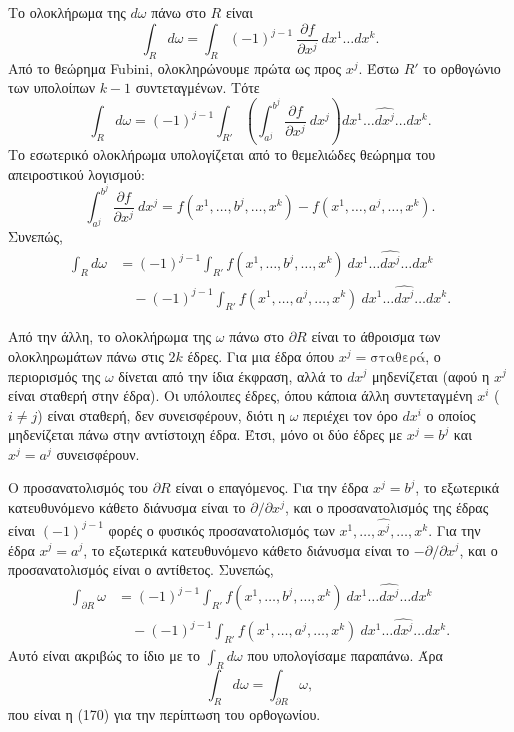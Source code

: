 \documentclass[12pt]{article}
\begin{document}
Το ολοκλήρωμα της $d\omega$ πάνω στο $R$ είναι
\[
\int_R d\omega = \int_R (-1)^{j-1} \ \frac{\partial f}{\partial x^j} \ dx^1 \dots dx^k.
\]
Από το θεώρημα Fubini, ολοκληρώνουμε πρώτα ως προς $x^j$. Έστω $R'$ το ορθογώνιο των υπολοίπων $k-1$ συντεταγμένων. Τότε
\[
\int_R d\omega = (-1)^{j-1} \int_{R'} \left( \int_{a^j}^{b^j} \frac{\partial f}{\partial x^j} \ dx^j \right) dx^1 \dots \widehat{dx^j} \dots dx^k.
\]
Το εσωτερικό ολοκλήρωμα υπολογίζεται από το θεμελιώδες θεώρημα του απειροστικού λογισμού:
\[
\int_{a^j}^{b^j} \frac{\partial f}{\partial x^j} \ dx^j = f(x^1, \dots, b^j, \dots, x^k) - f(x^1, \dots, a^j, \dots, x^k).
\]
Συνεπώς,
\[
\begin{aligned}
\int_R d\omega &= (-1)^{j-1} \int_{R'} f(x^1, \dots, b^j, \dots, x^k) \ dx^1 \dots \widehat{dx^j} \dots dx^k \\
&\quad - (-1)^{j-1} \int_{R'} f(x^1, \dots, a^j, \dots, x^k) \ dx^1 \dots \widehat{dx^j} \dots dx^k.
\end{aligned}
\]

Από την άλλη, το ολοκλήρωμα της $\omega$ πάνω στο $\partial R$ είναι το άθροισμα των ολοκληρωμάτων πάνω στις $2k$ έδρες. Για μια έδρα όπου $x^j = \text{σταθερά}$, ο περιορισμός της $\omega$ δίνεται από την ίδια έκφραση, αλλά το $dx^j$ μηδενίζεται (αφού η $x^j$ είναι σταθερή στην έδρα). Οι υπόλοιπες έδρες, όπου κάποια άλλη συντεταγμένη $x^i$ ($i \neq j$) είναι σταθερή, δεν συνεισφέρουν, διότι η $\omega$ περιέχει τον όρο $dx^i$ ο οποίος μηδενίζεται πάνω στην αντίστοιχη έδρα. Έτσι, μόνο οι δύο έδρες με $x^j = b^j$ και $x^j = a^j$ συνεισφέρουν.

Ο προσανατολισμός του $\partial R$ είναι ο επαγόμενος. Για την έδρα $x^j = b^j$, το εξωτερικά κατευθυνόμενο κάθετο διάνυσμα είναι το $\partial / \partial x^j$, και ο προσανατολισμός της έδρας είναι $(-1)^{j-1}$ φορές ο φυσικός προσανατολισμός των $x^1, \dots, \widehat{x^j}, \dots, x^k$. Για την έδρα $x^j = a^j$, το εξωτερικά κατευθυνόμενο κάθετο διάνυσμα είναι το $-\partial / \partial x^j$, και ο προσανατολισμός είναι ο αντίθετος. Συνεπώς,
\[
\begin{aligned}
\int_{\partial R} \omega &= (-1)^{j-1} \int_{R'} f(x^1, \dots, b^j, \dots, x^k) \ dx^1 \dots \widehat{dx^j} \dots dx^k \\
&\quad - (-1)^{j-1} \int_{R'} f(x^1, \dots, a^j, \dots, x^k) \ dx^1 \dots \widehat{dx^j} \dots dx^k.
\end{aligned}
\]
Αυτό είναι ακριβώς το ίδιο με το $\int_R d\omega$ που υπολογίσαμε παραπάνω. Άρα
\[
\int_R d\omega = \int_{\partial R} \omega,
\]
που είναι η (170) για την περίπτωση του ορθογωνίου.
\end{document}

